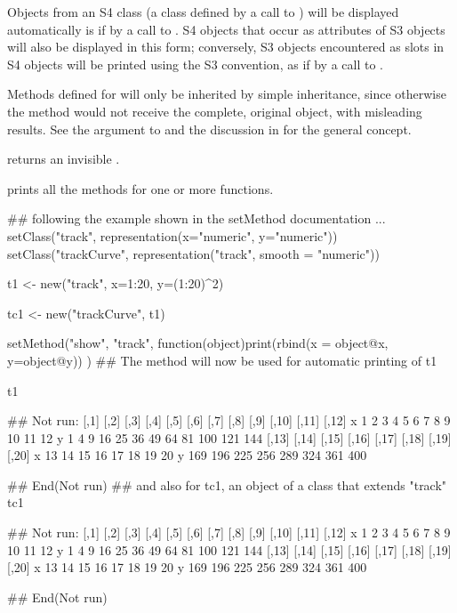 %
\begin{Details}\relax
Objects from an S4 class (a class defined by a call to
) will be displayed automatically is if by a
call to .  S4 objects that occur as attributes of S3
objects will also be displayed in this form; conversely, S3 objects
encountered as slots in S4 objects will be printed using the S3
convention, as if by a call to .

Methods defined for  will only be inherited  by simple
inheritance, since otherwise the method would not receive the
complete, original object, with misleading results.  See the
 argument to  and
the discussion in  for the general concept.

\end{Details}
%
\begin{Value}
 returns an invisible .
\end{Value}
%
\begin{SeeAlso}\relax
{} prints all the methods for one or more
functions.
\end{SeeAlso}
%
\begin{Examples}
\begin{ExampleCode}
## following the example shown in the setMethod documentation ...
setClass("track",
         representation(x="numeric", y="numeric"))
setClass("trackCurve", 
         representation("track", smooth = "numeric"))

t1 <- new("track", x=1:20, y=(1:20)^2)

tc1 <- new("trackCurve", t1)

setMethod("show", "track",
  function(object)print(rbind(x = object@x, y=object@y))
)
## The method will now be used for automatic printing of t1

t1

## Not run:   [,1] [,2] [,3] [,4] [,5] [,6] [,7] [,8] [,9] [,10] [,11] [,12]
x    1    2    3    4    5    6    7    8    9    10    11    12
y    1    4    9   16   25   36   49   64   81   100   121   144
  [,13] [,14] [,15] [,16] [,17] [,18] [,19] [,20]
x    13    14    15    16    17    18    19    20
y   169   196   225   256   289   324   361   400

## End(Not run)
## and also for tc1, an object of a class that extends "track"
tc1

## Not run:   [,1] [,2] [,3] [,4] [,5] [,6] [,7] [,8] [,9] [,10] [,11] [,12]
x    1    2    3    4    5    6    7    8    9    10    11    12
y    1    4    9   16   25   36   49   64   81   100   121   144
  [,13] [,14] [,15] [,16] [,17] [,18] [,19] [,20]
x    13    14    15    16    17    18    19    20
y   169   196   225   256   289   324   361   400

## End(Not run)
\end{ExampleCode}
\end{Examples}

